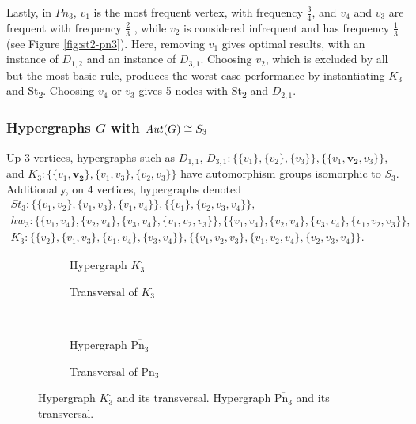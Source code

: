 Lastly, in $Pn_3$, $v_1$ is the most frequent vertex, with frequency $\frac{3}{4}$, and $v_4$ and $v_3$ are frequent with frequency $\frac{2}{3}$ , while $v_2$ is considered infrequent and has frequency $\frac{1}{3}$ (see Figure \ref{fig:st2-pn3}). Here, removing $v_1$ gives optimal results, with an instance of $D_{1,2}$ and an instance of $D_{3,1}$. Choosing $v_2$, which is excluded by all but the most basic rule, produces the worst-case performance by instantiating $K_3$ and St\textsubscript{2}. Choosing $v_4$ or $v_3$ gives 5 nodes with St\textsubscript{2} and $D_{2,1}$.

\subsubsection*{Hypergraphs $G$ with $\mathit{Aut}(G)\cong S_3$}

Up 3 vertices, hypergraphs such as $D_{1,1}$, $D_{3,1}:\{\{v_1\},\{v_2\},\{v_3\}\},\{\{v_1,\mathbf{v_2},v_3\}\}$, and $K_3:\{\{v_1,\mathbf{v_2}\},\{v_1,v_3\},\{v_2,v_3\}\}$ have automorphism groups isomorphic to $S_3$. Additionally, on 4 vertices, hypergraphs denoted
\begin{gather*}
St_3:\{\{v_1,v_2\},\{v_1,v_3\},\{v_1,v_4\}\},\{\{v_1\},\{v_2,v_3,v_4\}\},\\[4pt]
hw_3:\{\{v_1,v_4\},\{v_2,v_4\},\{v_3,v_4\},\{v_1,v_2,v_3\}\},\{\{v_1,v_4\},\{v_2,v_4\},\{v_3,v_4\},\{v_1,v_2,v_3\}\},\\[4pt]
K_3^{\cdot}:\{\{v_2\},\{v_1,v_3\},\{v_1,v_4\},\{v_3,v_4\}\},\{\{v_1,v_2,v_3\},\{v_1,v_2,v_4\},\{v_2,v_3,v_4\}\}.
\end{gather*}

\begin{figure}[tp]
\centering
\begin{subfigure}{0.45\linewidth}\centering\caption{Hypergraph $K_3^{\cdot}$}\end{subfigure}\hfill
\begin{subfigure}{0.45\linewidth}\centering\caption{Transversal of $K_3^{\cdot}$}\end{subfigure}\\[8pt]
\begin{subfigure}{0.45\linewidth}\centering\caption{Hypergraph $\overline{\text{Pn}_3}$}\end{subfigure}\hfill
\begin{subfigure}{0.45\linewidth}\centering\caption{Transversal of $\overline{\text{Pn}_3}$}\end{subfigure}
\caption{Hypergraph $K_3^{\cdot}$ and its transversal. Hypergraph $\overline{\text{Pn}_3}$ and its transversal.}\label{fig:k3dot-pn3bar}
\end{figure}

